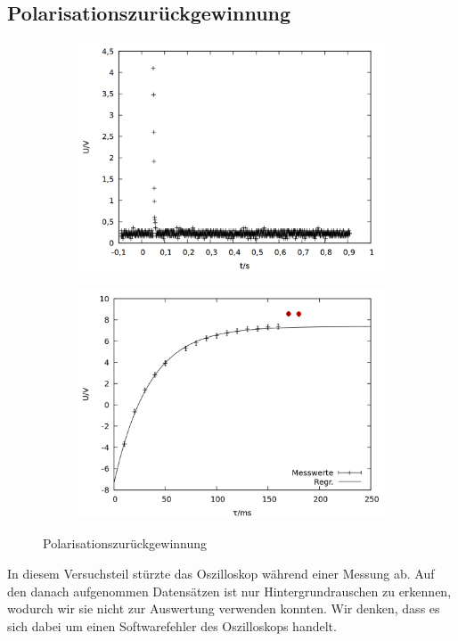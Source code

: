 \subsection{Polarisationszurückgewinnung}
\begin{figure}[h]
  \begin{subfigure}[h]{0.5\textwidth}
    \centering
    \includegraphics[width=\linewidth]{data/p402_443_data/polarisationszurueckgewinnung/plot_110.png}
    \label{fig:pol_bsp}
  \end{subfigure}%
  \begin{subfigure}[h]{0.5\textwidth}
    \centering
    \includegraphics[width=\linewidth]{data/p402_443_data/polarisationszurueckgewinnung/out_pol.png}
    \label{fig:pol_data}
  \end{subfigure}
  \caption{Polarisationszurückgewinnung}
\end{figure}
In diesem Versuchsteil stürzte das Oszilloskop während einer Messung ab. Auf den danach aufgenommen Datensätzen ist nur Hintergrundrauschen zu erkennen, wodurch wir sie nicht zur Auswertung verwenden konnten. Wir denken, dass es sich dabei um einen Softwarefehler des Oszilloskops handelt.\\
 
